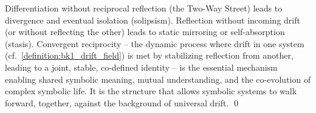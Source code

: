 \begin{scholium}
\label{scholium:bk7_on_symbolic_reciprocity}
Differentiation without reciprocal reflection (the Two-Way Street) leads to divergence and eventual isolation (solipsism). Reflection without incoming drift (or without reflecting the other) leads to static mirroring or self-absorption (stasis). Convergent reciprocity -- the dynamic process where drift in one system (cf.~\ref{definition:bk1_drift_field}) is met by stabilizing reflection from another, leading to a joint, stable, co-defined identity -- is the essential mechanism enabling shared symbolic meaning, mutual understanding, and the co-evolution of complex symbolic life. It is the structure that allows symbolic systems to walk forward, together, against the background of universal drift. \qed
\end{scholium}
